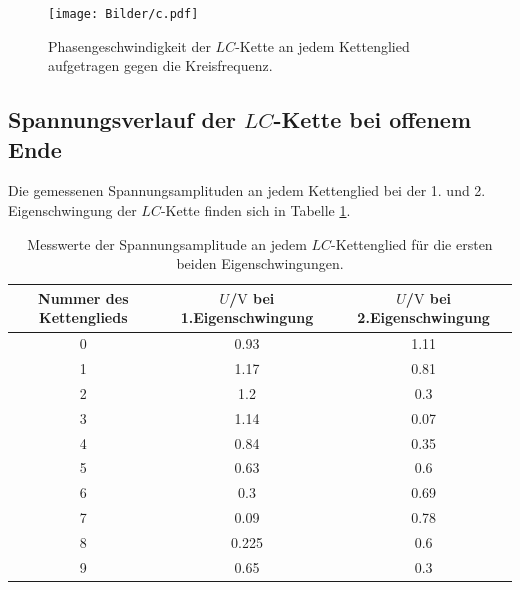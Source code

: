 \begin{figure}
	\centering
	\texttt{[image: Bilder/c.pdf]}
	\caption{Phasengeschwindigkeit der $LC$-Kette an jedem Kettenglied aufgetragen gegen die Kreisfrequenz.}
	\label{fig:plotc}
\end{figure}
\FloatBarrier
\subsection{Spannungsverlauf der $LC$-Kette bei offenem Ende}
Die gemessenen Spannungsamplituden an jedem Kettenglied bei der 1. und 2. Eigenschwingung der $LC$-Kette finden sich in Tabelle \ref{tab:ei}.

\begin{table}
	\centering
	\caption{Messwerte der Spannungsamplitude an jedem $LC$-Kettenglied für die ersten beiden Eigenschwingungen.}
	\label{tab:ei}
	\begin{tabular}{ccc}
		\toprule
		Nummer des Kettenglieds & $U$/$\si{\volt}$ bei 1.Eigenschwingung & $U$/$\si{\volt}$ bei 2.Eigenschwingung \\
		\midrule
		0                       & 0.93                                   & 1.11                                   \\
		1                       & 1.17                                   & 0.81                                   \\
		2                       & 1.2                                    & 0.3                                    \\
		3                       & 1.14                                   & 0.07                                   \\
		4                       & 0.84                                   & 0.35                                   \\
		5                       & 0.63                                   & 0.6                                    \\
		6                       & 0.3                                    & 0.69                                   \\
		7                       & 0.09                                   & 0.78                                   \\
		8                       & 0.225                                  & 0.6                                    \\
		9                       & 0.65                                   & 0.3                                    \\

\end{tabular}
\end{table}
